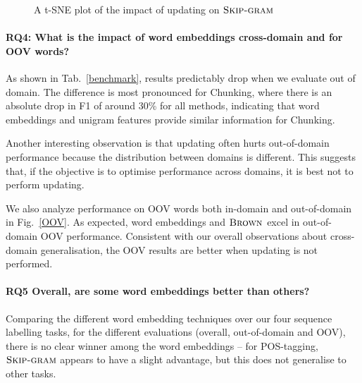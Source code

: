 \documentclass[11pt]{article}
\newcommand{\RQ}[1][1]{\textbf{RQ#1}\xspace}
\newcommand{\figref}[2][]{Fig#1.~\ref{#2}\xspace}
\newcommand{\tabref}[2][]{Tab#1.~\ref{#2}\xspace}
\newcommand{\method}[2][]{\ensuremath{\textsc{#2#1}}\xspace}
\newcommand{\brown}[1][]{\method[\ensuremath{_{#1}}]{Brown}}
\newcommand{\Skipgram}[1][]{\method[#1]{Skip-gram}}
\newcommand{\task}[1]{\textsf{#1}\xspace}
\newcommand{\pos}{\task{POS-tagging}}
\newcommand{\chunking}{\task{Chunking}}
\newcommand{\ner}{\task{NER}}
\newcommand{\evmeasure}[1]{\textsc{#1}\xspace}
\newcommand{\fscore}{\evmeasure{F1}}
\begin{document}
\begin{figure}[t!]
\begin{subfigure}[b]{0.48\textwidth}
	\subcaption{\ner}
	\label{fig:skippos}	
\end{subfigure}
\caption{A t-SNE plot of the impact of updating on \Skipgram}
\label{fig:vectorfield}
\end{figure}


\paragraph{\RQ[4]: What is the impact of word embeddings cross-domain
  and for OOV words?}
As shown in \tabref{benchmark}, results predictably drop when we
evaluate out of domain.
The difference is most pronounced for \chunking, where there is an
absolute drop in \fscore of around 30\% for all methods, indicating that
word embeddings and unigram features provide similar information for
\chunking. 

Another interesting observation is that updating often hurts
out-of-domain performance because the distribution between domains is different. 
This suggests that, if the objective is to optimise performance across
domains, it is best not to perform updating. 

We also analyze performance on OOV words both in-domain and
out-of-domain in \figref{OOV}.
As expected, word embeddings and \brown excel in out-of-domain OOV performance.
Consistent with our overall observations about cross-domain
generalisation, the OOV results are better when updating is not performed. 

\paragraph{\RQ[5] Overall, are some word embeddings better than others?}
Comparing the different word embedding techniques over our four sequence
labelling tasks, for the different evaluations (overall, out-of-domain
and OOV), there is no clear winner among the word embeddings -- for
\pos, \Skipgram appears to have a slight advantage, but this does not
generalise to other tasks.\\
\end{document}

